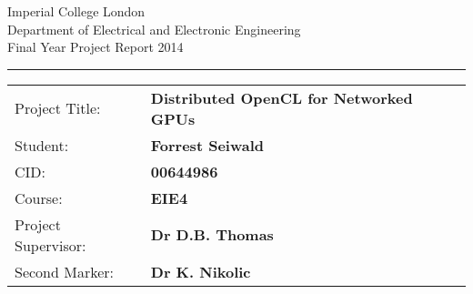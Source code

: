 \documentclass[thesis.tex]{subfiles}
\begin{document}
\begin{titlepage}
\setlength{\parindent}{0pt}
\setlength{\parskip}{0pt}

{
\Large
\raggedright
Imperial College London\\[17pt]
Department of Electrical and Electronic Engineering\\[17pt]
Final Year Project Report 2014\\[17pt]

}
\rule{\columnwidth}{3pt}

\vfill

\centering

\vfill

\setlength{\tabcolsep}{0pt}
\begin{tabular}{p{40mm}p{\dimexpr\columnwidth-40mm}}
Project Title: & \textbf{Distributed OpenCL for Networked GPUs} \\[12pt]
Student: & \textbf{Forrest Seiwald} \\[12pt]
CID: & \textbf{00644986} \\[12pt]
Course: & \textbf{EIE4} \\[12pt]
Project Supervisor: & \textbf{Dr D.B. Thomas} \\[12pt]
Second Marker: & \textbf{Dr K. Nikolic} \\
\end{tabular}
\end{titlepage}
\end{document}
